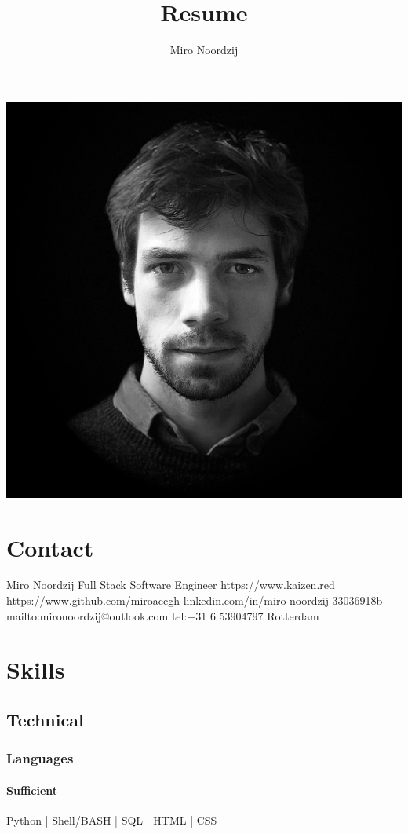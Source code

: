\documentclass{article}
\begin{document}
\title{Resume}
\author{Miro Noordzij}

\includegraphics{avatar}

\maketitle

\section{Contact}
Miro Noordzij Full Stack Software Engineer
https://www.kaizen.red
https://www.github.com/miroaccgh
linkedin.com/in/miro-noordzij-33036918b
mailto:mironoordzij@outlook.com
tel:+31 6 53904797
Rotterdam

\section{Skills}

\subsection{Technical}
\subsubsection{Languages}
\paragraph{Sufficient}
	Python | Shell/BASH | SQL | HTML | CSS 
\end{document}
